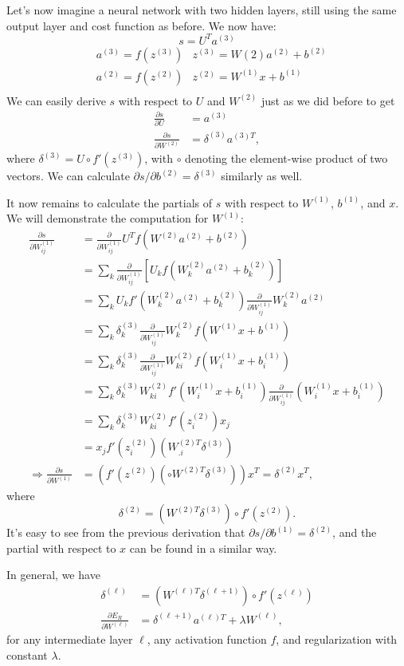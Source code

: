 Let's now imagine a neural network with two hidden layers, still using the same output layer and cost function as before. We now have:
$$s = U^Ta^{(3)}$$ 
\begin{align*}
&a^{(3)} = f(z^{(3)}) &z^{(3)} = W{(2)}a^{(2)} + b^{(2)}\\
&a^{(2)} = f(z^{(2)}) &z^{(2)} = W^{(1)}x + b^{(1)}\\
\end{align*}
We can easily derive $s$ with respect to $U$ and $W^{(2)}$ just as we did before to get
\begin{align*}
\frac{\partial s}{\partial U} &= a^{(3)} \\
\frac{\partial s}{\partial W^{(2)}} &= \delta^{(3)}a^{(3)T},
\end{align*}
where $\delta^{(3)} = U \circ f'(z^{(3)})$, with $\circ$ denoting the element-wise product of two vectors. We can calculate $\partial s/\partial b^{(2)} = \delta^{(3)}$ similarly as well.

It now remains to calculate the partials of $s$ with respect to $W^{(1)}$, $b^{(1)}$, and $x$. We will demonstrate the computation for $W^{(1)}$:
\begin{align*}
\frac{\partial s}{\partial W_{ij}^{(1)}} &= \frac{\partial}{\partial W_{ij}^{(1)}}U^Tf(W^{(2)}a^{(2)} + b^{(2)})\\
&= \sum_k\frac{\partial}{\partial W_{ij}^{(1)}} \left[U_k f(W_k^{(2)}a^{(2)} + b_k^{(2)}) \right]\\
&= \sum_k  U_kf'(W_k^{(2)}a^{(2)} + b_k^{(2)}) \frac{\partial}{\partial W_{ij}^{(1)}} W_k^{(2)}a^{(2)}\\
&= \sum_k \delta^{(3)}_k \frac{\partial}{\partial W_{ij}^{(1)}}W_k^{(2)}f(W^{(1)}x + b^{(1)})\\
&= \sum_k \delta^{(3)}_k \frac{\partial}{\partial W_{ij}^{(1)}}W_{ki}^{(2)}f(W_i^{(1)}x + b_i^{(1)})\\
&= \sum_k \delta^{(3)}_k W_{ki}^{(2)} f'(W_i^{(1)}x + b_i^{(1)})\frac{\partial}{\partial W_{ij}^{(1)}} \left(W_i^{(1)}x + b_i^{(1)}\right)\\
&= \sum_k \delta_k^{(3)} W_{ki}^{(2)} f'(z^{(2)}_i)x_j\\
&= x_jf'(z_i^{(2)})\left(W_{.i}^{(2)T}\delta^{(3)}\right)\\
\Rightarrow \frac{\partial s}{\partial W^{(1)}} &= \left(f'(z^{(2)}) \left(\circ W^{(2)T} \delta^{(3)}\right)\right) x^T = \delta^{(2)} x^T,
\end{align*}
where
$$\delta^{(2)} = \left(W^{(2)T} \delta^{(3)}\right) \circ f'(z^{(2)}).$$
It's easy to see from the previous derivation that $\partial s/\partial b^{(1)} = \delta^{(2)}$, and the partial with respect to $x$ can be found in a similar way.

In general, we have
\begin{align*}
\delta^{(\ell)} &= \left(W^{(\ell)T}\delta^{(\ell + 1)}\right) \circ f'(z^{(\ell)})\\
\frac{\partial E_R}{\partial W^{(\ell)}} &= \delta^{(\ell + 1)}a^{(\ell)T} + \lambda W^{(\ell)},
\end{align*}
for any intermediate layer $\ell$, any activation function $f$, and regularization with constant $\lambda$.
